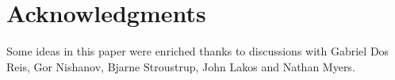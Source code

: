 \section{Acknowledgments}

Some ideas in this paper were enriched thanks to discussions with Gabriel Dos
Reis, Gor Nishanov, Bjarne Stroustrup, John Lakos and Nathan Myers.

